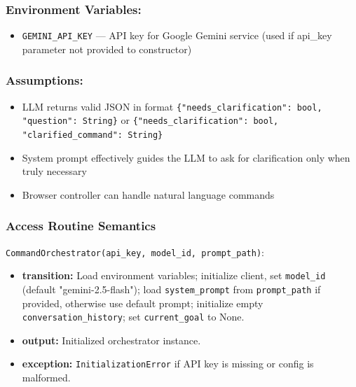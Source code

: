 \documentclass[12pt, titlepage]{article}
\begin{document}
\subsubsection{Environment Variables:}
\begin{itemize}
  \item \texttt{GEMINI\_API\_KEY} — API key for Google Gemini service (used if api\_key parameter not provided to constructor)
\end{itemize}

\subsubsection{Assumptions:}
\begin{itemize}
  \item LLM returns valid JSON in format \texttt{\{"needs\_clarification": bool, "question": String\}} or \texttt{\{"needs\_clarification": bool, "clarified\_command": String\}}
  \item System prompt effectively guides the LLM to ask for clarification only when truly necessary
  \item Browser controller can handle natural language commands
\end{itemize}

\subsubsection{Access Routine Semantics}

\noindent\texttt{CommandOrchestrator(api\_key, model\_id, prompt\_path)}:
\begin{itemize}
  \item \textbf{transition:} Load environment variables; initialize client, set \texttt{model\_id} (default "gemini-2.5-flash"); load \texttt{system\_prompt} from \texttt{prompt\_path} if provided, otherwise use default prompt; initialize empty \texttt{conversation\_history}; set \texttt{current\_goal} to None.
  \item \textbf{output:} Initialized orchestrator instance.
  \item \textbf{exception:} \texttt{InitializationError} if API key is missing or config is malformed.
\end{itemize}
\end{document}
